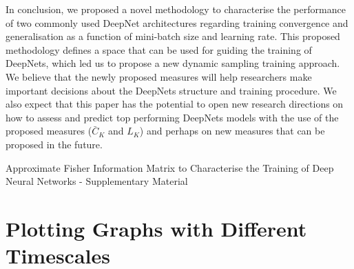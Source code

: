 \documentclass[10pt,journal,compsoc]{IEEEtran}
\begin{document}
In conclusion, we proposed a novel methodology to characterise the performance of two commonly used DeepNet architectures regarding training convergence and generalisation as a function of mini-batch size and learning rate.  
This proposed methodology defines a space that can be used for guiding the training of DeepNets, which led us to propose a new dynamic sampling training approach.  
We believe that the newly proposed measures will help researchers make important decisions about the DeepNets structure and training procedure.  
We also expect that this paper has the potential to open new research directions on how to assess and predict top performing DeepNets models with the use of the proposed measures ($\bar{C}_K$ and $L_K$) and perhaps on new measures that can be proposed in the future.








{\small


}

\newpage
\onecolumn

\begin{center}
\textup{\Huge Approximate Fisher Information Matrix to Characterise the Training of Deep Neural Networks - Supplementary Material}
\end{center}

\vspace{20mm}
\setcounter{section}{0}

\section{Plotting Graphs with Different Timescales}%
\end{document}
